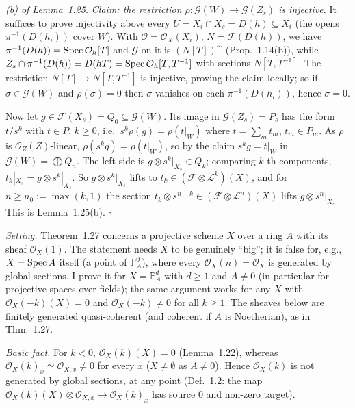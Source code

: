 \documentclass[11pt]{article}
\begin{document}
\emph{(b) of Lemma~1.25.} \emph{Claim: the restriction $\rho:\mathcal G(W)\to\mathcal G(Z_s)$ is injective.} It suffices to prove injectivity above every $U=X_i\cap X_s=D(h)\subseteq X_i$ (the opens $\pi^{-1}(D(h_i))$ cover $W$). With $\mathcal O=\mathcal O_X(X_i)$, $N=\mathcal F(D(h))$, we have $\pi^{-1}(D(h))=\operatorname{Spec}\mathcal O_h[T]$ and $\mathcal G$ on it is $(N[T])^\sim$ (Prop.~1.14(b)), while $Z_s\cap\pi^{-1}(D(h))=D(hT)=\operatorname{Spec}\mathcal O_h[T,T^{-1}]$ with sections $N[T,T^{-1}]$. The restriction $N[T]\to N[T,T^{-1}]$ is injective, proving the claim locally; so if $\sigma\in\mathcal G(W)$ and $\rho(\sigma)=0$ then $\sigma$ vanishes on each $\pi^{-1}(D(h_i))$, hence $\sigma=0$.

Now let $g\in\mathcal F(X_s)=Q_0\subseteq\mathcal G(W)$. Its image in $\mathcal G(Z_s)=P_s$ has the form $t/s^k$ with $t\in P$, $k\ge0$, i.e.\ $s^k\rho(g)=\rho(t|_W)$ where $t=\sum_mt_m$, $t_m\in P_m$. As $\rho$ is $\mathcal O_Z(Z)$-linear, $\rho(s^kg)=\rho(t|_W)$, so by the claim $s^kg=t|_W$ in $\mathcal G(W)=\bigoplus Q_n$. The left side is $g\otimes s^k|_{X_s}\in Q_k$; comparing $k$-th components, $t_k|_{X_s}=g\otimes s^k|_{X_s}$. So $g\otimes s^k|_{X_s}$ lifts to $t_k\in(\mathcal F\otimes\mathcal L^k)(X)$, and for $n\ge n_0:=\max(k,1)$ the section $t_k\otimes s^{n-k}\in(\mathcal F\otimes\mathcal L^n)(X)$ lifts $g\otimes s^n|_{X_s}$. This is Lemma~1.25(b). \hfill$\square$

\pf
\emph{Setting.} Theorem~1.27 concerns a projective scheme $X$ over a ring $A$ with its sheaf $\mathcal O_X(1)$. The statement needs $X$ to be genuinely ``big''; it is false for, e.g., $X=\operatorname{Spec} A$ itself (a point of $\mathbb P^0_A$), where every $\mathcal O_X(n)=\mathcal O_X$ is generated by global sections. I prove it for $X=\mathbb P^d_A$ with $d\ge1$ and $A\neq0$ (in particular for projective spaces over fields); the same argument works for any $X$ with $\mathcal O_X(-k)(X)=0$ and $\mathcal O_X(-k)\neq0$ for all $k\ge1$. The sheaves below are finitely generated quasi-coherent (and coherent if $A$ is Noetherian), as in Thm.~1.27.

\emph{Basic fact.} For $k<0$, $\mathcal O_X(k)(X)=0$ (Lemma~1.22), whereas $\mathcal O_X(k)_x\simeq\mathcal O_{X,x}\neq0$ for every $x$ ($X\neq\emptyset$ as $A\neq0$). Hence $\mathcal O_X(k)$ is not generated by global sections, at any point (Def.~1.2: the map $\mathcal O_X(k)(X)\otimes\mathcal O_{X,x}\to\mathcal O_X(k)_x$ has source $0$ and non-zero target).
\end{document}
